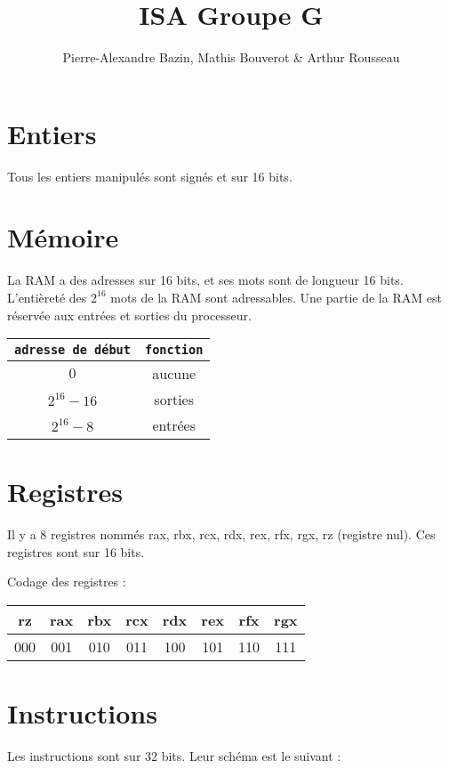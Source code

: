 \documentclass[a4paper]{article}
\title{ISA Groupe G}
\author{Pierre-Alexandre Bazin, Mathis Bouverot \& Arthur Rousseau}
\date{}
\begin{document}
    \maketitle

    \section{Entiers}

    Tous les entiers manipulés sont signés et sur 16 bits.

    \section{Mémoire}
    La RAM a des adresses sur 16 bits, et ses mots sont de longueur 16 bits.
    L'entièreté des $2^{16}$ mots de la RAM sont adressables. 
    Une partie de la RAM est réservée aux entrées et sorties du processeur.

    \begin{tabular}{|c|c|}
        \hline
        \texttt{adresse de début} & \texttt{fonction} \\
        \hline
        $0$ & aucune \\
        \hline
        $2^{16}-16$ & sorties \\
        \hline    
        $2^{16}-8$ & entrées \\
        \hline
    \end{tabular}

    \section{Registres}
    
    Il y a 8 registres nommés rax, rbx, rcx, rdx, rex, rfx, rgx, rz (registre nul).
    Ces registres sont sur 16 bits. 
    
    Codage des registres :

    \begin{tabular}{|c|c|c|c|c|c|c|c|}
        \hline
        rz  & rax & rbx & rcx & rdx & rex & rfx & rgx \\
        \hline
        000 & 001 & 010 & 011 & 100 & 101 & 110 & 111 \\
        \hline  
    \end{tabular}

    \section{Instructions}
    Les instructions sont sur 32 bits. Leur schéma est le suivant :
\end{document}
